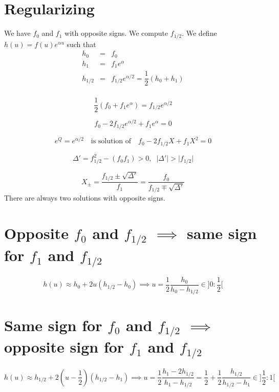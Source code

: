 \documentclass[aps,12pt]{revtex4}
\begin{document}
\section{Regularizing}
We have $f_0$ and $f_1$ with opposite signs.
We compute $f_{1/2}$.
We define $h(u) = f(u) e^{\alpha u}$ such that
\begin{equation}
\begin{array}{lcl}
h_0  & = & f_0  \\
h_1  & = & f_1 e^{\alpha} \\
h_{1/2} & = & f_{1/2} e^{\alpha/2} = \dfrac{1}{2}( h_0+h_1 )\\
\end{array}
\end{equation}
 
\begin{equation}
	\dfrac{1}{2}( f_0+f_1 e^\alpha ) = f_{1/2} e^{\alpha/2} 
\end{equation} 

\begin{equation}
	f_0 - 2 f_{1/2} e^{\alpha/2}  + f_1 e^\alpha = 0
\end{equation} 

$$
	e^Q = e^{\alpha/2} \text{~~~is solution of~~~} f_0 - 2 f_{1/2} X  + f_1 X^2 = 0
$$

\begin{equation}
	\Delta' = f_{1/2}^2 - (f_0f_1) > 0, \;\; \vert \Delta' \vert > \vert f_{1/2} \vert
\end{equation}

\begin{equation}
	X_\pm = \dfrac{ f_{1/2} \pm \sqrt{\Delta'} }{f_1} = \dfrac{f_0}{f_{1/2} \mp \sqrt{\Delta'}}
\end{equation}
There are always two solutions with opposite signs.
 
\section{Opposite $f_0$ and $f_{1/2}$ $\implies$ same sign for $f_1$ and $f_{1/2}$}
 
 $$
 	h(u) \approx h_0 + 2 u (h_{1/2}-h_0) \implies u = \dfrac{1}{2} \dfrac{h_0}{h_0-h_{1/2}} \in ]0:\frac{1}{2}[
 $$
 
 \section{Same sign for $f_0$ and $f_{1/2}$ $\implies$ opposite sign for $f_1$ and $f_{1/2}$}

$$
	h(u) \approx h_{1/2} + 2(u-\dfrac{1}{2})(h_{1/2}-h_1) \implies u = \dfrac{1}{2}\dfrac{h_1 - 2h_{1/2}}{h_1-h_{1/2}}
	= \frac{1}{2} + \frac{1}{2} \dfrac{h_{1/2}}{h_{1/2}-h_1} \in ]\frac{1}{2}:1[
$$
 
  
  
\end{document}
